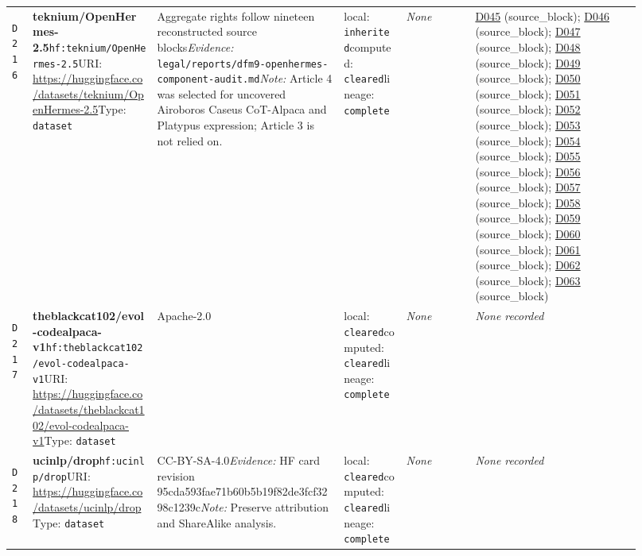 \documentclass[9pt,a4paper]{article}
\newcommand{\depid}[1]{\hypertarget{dep:#1}{\texttt{#1}}}
\begin{document}
\begin{landscape}
\begin{longtable}{@{}L{0.035\linewidth}L{0.185\linewidth}L{0.27\linewidth}L{0.09\linewidth}L{0.10\linewidth}L{0.24\linewidth}@{}}
\depid{D216} & \textbf{teknium/OpenHermes-2.5}\newline \nolinkurl{hf:teknium/OpenHermes-2.5}\newline URI: \url{https://huggingface.co/datasets/teknium/OpenHermes-2.5}\newline Type: \texttt{dataset} & Aggregate rights follow nineteen reconstructed source blocks\newline \textit{Evidence:} \nolinkurl{legal/reports/dfm9-openhermes-component-audit.md}\newline \textit{Note:} Article 4 was selected for uncovered Airoboros Caseus CoT-Alpaca and Platypus expression; Article 3 is not relied on. & local: \texttt{inherited}\newline computed: \texttt{cleared}\newline lineage: \texttt{complete} & \textit{None} & \hyperlink{dep:D045}{D045} (source\_block); \hyperlink{dep:D046}{D046} (source\_block); \hyperlink{dep:D047}{D047} (source\_block); \hyperlink{dep:D048}{D048} (source\_block); \hyperlink{dep:D049}{D049} (source\_block); \hyperlink{dep:D050}{D050} (source\_block); \hyperlink{dep:D051}{D051} (source\_block); \hyperlink{dep:D052}{D052} (source\_block); \hyperlink{dep:D053}{D053} (source\_block); \hyperlink{dep:D054}{D054} (source\_block); \hyperlink{dep:D055}{D055} (source\_block); \hyperlink{dep:D056}{D056} (source\_block); \hyperlink{dep:D057}{D057} (source\_block); \hyperlink{dep:D058}{D058} (source\_block); \hyperlink{dep:D059}{D059} (source\_block); \hyperlink{dep:D060}{D060} (source\_block); \hyperlink{dep:D061}{D061} (source\_block); \hyperlink{dep:D062}{D062} (source\_block); \hyperlink{dep:D063}{D063} (source\_block) \\
\depid{D217} & \textbf{theblackcat102/evol-codealpaca-v1}\newline \nolinkurl{hf:theblackcat102/evol-codealpaca-v1}\newline URI: \url{https://huggingface.co/datasets/theblackcat102/evol-codealpaca-v1}\newline Type: \texttt{dataset} & Apache-2.0 & local: \texttt{cleared}\newline computed: \texttt{cleared}\newline lineage: \texttt{complete} & \textit{None} & \textit{None recorded} \\
\depid{D218} & \textbf{ucinlp/drop}\newline \nolinkurl{hf:ucinlp/drop}\newline URI: \url{https://huggingface.co/datasets/ucinlp/drop}\newline Type: \texttt{dataset} & CC-BY-SA-4.0\newline \textit{Evidence:} HF card revision 95cda593fae71b60b5b19f82de3fcf3298c1239c\newline \textit{Note:} Preserve attribution and ShareAlike analysis. & local: \texttt{cleared}\newline computed: \texttt{cleared}\newline lineage: \texttt{complete} & \textit{None} & \textit{None recorded} \\

\end{longtable}
\end{landscape}
\end{document}

